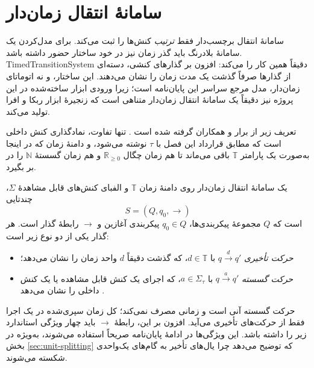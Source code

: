 \section{سامانهٔ انتقال زمان‌دار}
\label{sec:tts}

سامانهٔ انتقال برچسب‌دار فقط \emph{ترتیب} کنش‌ها را ثبت می‌کند. برای مدل‌کردن یک سامانهٔ بلادرنگ باید گذر زمان نیز در خود ساختار حضور داشته باشد. \gls{TimedTransitionSystem} دقیقاً همین کار را می‌کند: افزون بر گذارهای کنشی، دسته‌ای از گذارها صرفاً گذشت یک مدت زمان را نشان می‌دهند. این ساختار، و نه اتوماتای زمان‌دار، مدل مرجع سراسر این پایان‌نامه است؛ زیرا ورودی ابزار ساخته‌شده در این پروژه نیز دقیقاً یک سامانهٔ انتقال زمان‌دار متناهی است که زنجیرهٔ ابزار ربکا و افرا تولید می‌کند.

تعریف زیر از برار و همکاران گرفته شده است \cite{BerardEtAl2008}. تنها تفاوت، نمادگذاری کنش داخلی است که مطابق قرارداد این فصل با $\tau$ نوشته می‌شود، و دامنهٔ زمان که در اینجا به‌صورت یک پارامتر $\mathbb{T}$ باقی می‌ماند تا هم زمان چگال $\mathbb{R}_{\geq0}$ و هم زمان گسستهٔ $\mathbb{N}$ را در بر بگیرد.

\begin{definition}
\label{def:tts}
یک سامانهٔ انتقال زمان‌دار روی دامنهٔ زمان $\mathbb{T}$ و الفبای کنش‌های قابل مشاهدهٔ $\Sigma$، چندتایی
\[
S=(Q,q_0,\rightarrow)
\]
است که $Q$ مجموعهٔ پیکربندی‌ها، $q_0\in Q$ پیکربندی آغازین و $\rightarrow$ رابطهٔ گذار است. هر گذار یکی از دو نوع زیر است:
\begin{itemize}
\item \emph{حرکت تأخیری} $q\xrightarrow{d}q'$ با $d\in\mathbb{T}$، که گذشت دقیقاً $d$ واحد زمان را نشان می‌دهد؛
\item \emph{حرکت گسسته} $q\xrightarrow{a}q'$ با $a\in\Sigma_\tau$، که اجرای یک کنش قابل مشاهده یا یک کنش داخلی را نشان می‌دهد \cite{BerardEtAl2008}.
\end{itemize}
\end{definition}

حرکت گسسته آنی است و زمانی مصرف نمی‌کند؛ کل زمان سپری‌شده در یک اجرا فقط از حرکت‌های تأخیری می‌آید. افزون بر این، رابطهٔ $\rightarrow$ باید چهار ویژگی استاندارد زیر را داشته باشد. این ویژگی‌ها در ادامهٔ پایان‌نامه صریحاً استفاده می‌شوند، به‌ویژه در بخش \ref{sec:unit-splitting} که توضیح می‌دهد چرا یال‌های تأخیر به گام‌های یک‌واحدی شکسته می‌شوند.

